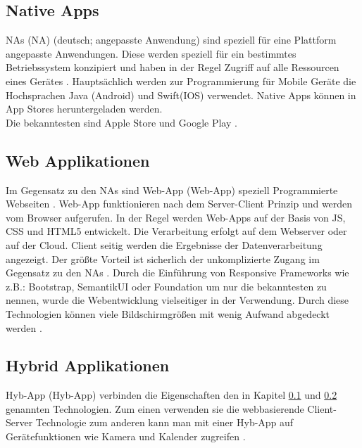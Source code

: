 \subsection{Native Apps}\label{chap:Native Apps}
\acl{NA}s (NA) (deutsch; angepasste Anwendung) sind speziell für eine Plattform angepasste Anwendungen. 
Diese werden speziell für ein bestimmtes Betriebssystem konzipiert und haben in der Regel Zugriff auf alle Ressourcen eines Gerätes \cite{NativeApp}.
Hauptsächlich werden zur Programmierung für Mobile Geräte die Hochsprachen Java (Android) und Swift(IOS) verwendet. Native Apps können in App Stores heruntergeladen  werden. \\Die bekanntesten sind Apple Store und Google Play \cite{Hochsprachen}.

\subsection{Web Applikationen}\label{chap:Webapplikationen}
Im Gegensatz zu den \acs{NA}s sind \acl{Web-App} (\acs{Web-App}) speziell Programmierte Webseiten \cite{Hochsprachen}.
\acs{Web-App} funktionieren nach dem Server-Client Prinzip und werden vom Browser aufgerufen. In der Regel werden \acs{Web-App}s auf der Basis von \acs{JS}, \acs{CSS} und \acs{HTML}5 entwickelt. Die Verarbeitung erfolgt auf dem Webserver oder auf der Cloud. 
Client seitig werden die Ergebnisse der Datenverarbeitung angezeigt. Der größte Vorteil ist sicherlich der unkomplizierte Zugang im Gegensatz zu den \acs{NA}s \cite{WebApps}.
Durch die Einführung von Responsive Frameworks wie z.B.: Bootstrap, SemantikUI oder Foundation um nur die bekanntesten zu nennen, wurde die Webentwicklung vielseitiger in der Verwendung. Durch diese Technologien können viele Bildschirmgrößen mit wenig Aufwand abgedeckt werden \cite{CSS}. 

\subsection{Hybrid Applikationen}
\acl{Hyb-App} (\acs{Hyb-App}) verbinden die Eigenschaften den in Kapitel \ref{chap:Native Apps} und \ref{chap:Webapplikationen} genannten Technologien. Zum einen verwenden sie die webbasierende Client-Server Technologie zum anderen kann man mit einer \acs{Hyb-App} auf Gerätefunktionen wie Kamera und Kalender zugreifen \cite{HybridApps}. 

